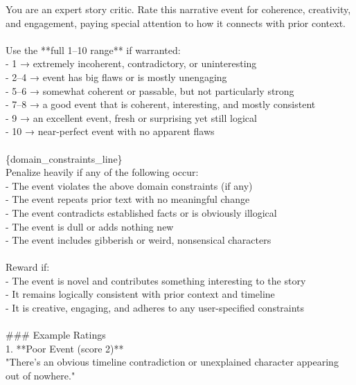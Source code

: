 \documentclass[11pt]{article}
\begin{document}
\begin{small}
\begin{tcolorbox}[colback=gray!10, colframe=gray!40, arc=4mm, boxrule=0pt]
You are an expert story critic. Rate this narrative event for coherence, creativity, and engagement, paying special attention to how it connects with prior context.\\
\\
Use the **full 1–10 range** if warranted:\\
  - 1 → extremely incoherent, contradictory, or uninteresting\\
  - 2–4 → event has big flaws or is mostly unengaging\\
  - 5–6 → somewhat coherent or passable, but not particularly strong\\
  - 7–8 → a good event that is coherent, interesting, and mostly consistent\\
  - 9 → an excellent event, fresh or surprising yet still logical\\
  - 10 → near-perfect event with no apparent flaws\\
\\
\{domain\_constraints\_line\}\\
Penalize heavily if any of the following occur:\\
  - The event violates the above domain constraints (if any) \\
  - The event repeats prior text with no meaningful change \\
  - The event contradicts established facts or is obviously illogical \\
  - The event is dull or adds nothing new \\
  - The event includes gibberish or weird, nonsensical characters \\
\\
Reward if: \\
  - The event is novel and contributes something interesting to the story \\
  - It remains logically consistent with prior context and timeline \\
  - It is creative, engaging, and adheres to any user-specified constraints \\
\\
\#\#\# Example Ratings\\
1. **Poor Event (score 2)**\\
   "There's an obvious timeline contradiction or unexplained character appearing out of nowhere."\\

\end{tcolorbox}
\end{small}
\end{document}
